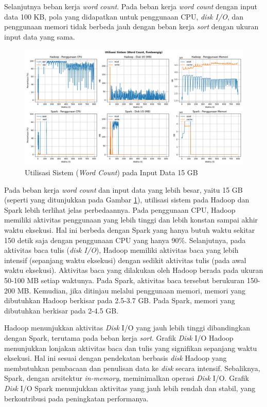 Selanjutnya beban kerja \textit{word count}. Pada beban kerja \textit{word count} dengan input data 100 KB, pola yang didapatkan untuk penggunaan CPU, \textit{disk I/O}, dan penggunaan memori tidak berbeda jauh dengan beban kerja \textit{sort} dengan ukuran input data yang sama. 

\begin{figure}[h]
    \centering
    \includegraphics[width=1\textwidth]{figures/ch04/5-util-sistem-wordcount-fiveteengig}
    \caption{Utilisasi Sistem (\textit{Word Count}) pada Input Data 15 GB}
    \label{fig:5-util-sistem-wordcount-fiveteengig}
\end{figure}

Pada beban kerja \textit{word count} dan input data yang lebih besar, yaitu 15 GB (seperti yang ditunjukkan pada Gambar \ref{fig:5-util-sistem-wordcount-fiveteengig}), utilisasi sistem pada Hadoop dan Spark lebih terlihat jelas perbedaannya. Pada penggunaan CPU, Hadoop memiliki aktivitas penggunaan yang lebih tinggi dan lebih konstan sampai akhir waktu eksekusi. Hal ini berbeda dengan Spark yang hanya butuh waktu sekitar 150 detik saja dengan penggunaan CPU yang hanya 90\%. Selanjutnya, pada aktivitas baca tulis (\textit{disk I/O}), Hadoop memiliki aktivitas baca yang lebih intensif (sepanjang waktu eksekusi) dengan sedikit aktivitas tulis (pada awal waktu eksekusi). Aktivitas baca yang dilakukan oleh Hadoop berada pada ukuran 50-100 MB setiap waktunya. Pada Spark, aktivitas baca tersebut berukuran 150-200 MB. Kemudian, jika ditinjau melalui penggunaan memori, memori yang dibutuhkan Hadoop berkisar pada 2.5-3.7 GB. Pada Spark, memori yang dibutuhkan berkisar pada 2-4.5 GB.  

Hadoop menunjukkan aktivitas \textit{Disk} I/O yang jauh lebih tinggi dibandingkan dengan Spark, terutama pada beban kerja \textit{sort}. Grafik \textit{Disk} I/O Hadoop menunjukkan lonjakan aktivitas baca dan tulis yang signifikan sepanjang waktu eksekusi. Hal ini sesuai dengan pendekatan berbasis \textit{disk} Hadoop yang membutuhkan pembacaan dan penulisan data ke \textit{disk} secara intensif. Sebaliknya, Spark, dengan arsitektur \textit{in-memory}, meminimalkan operasi \textit{Disk} I/O. Grafik \textit{Disk} I/O Spark menunjukkan aktivitas yang jauh lebih rendah dan stabil, yang berkontribusi pada peningkatan performanya.

